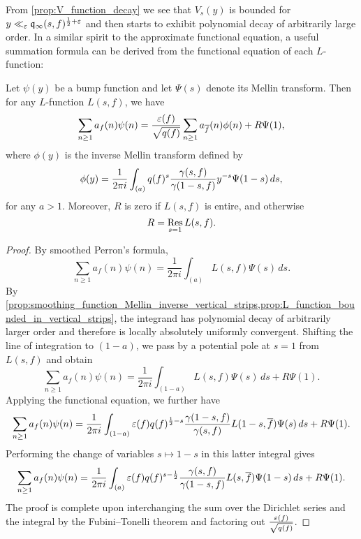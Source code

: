     From \cref{prop:V_function_decay} we see that $V_{s}(y)$ is bounded for $y \ll_{\varepsilon} \mathfrak{q}_{\infty}(s,f)^{\frac{1}{2}+\varepsilon}$ and then starts to exhibit polynomial decay of arbitrarily large order. In a similar spirit to the approximate functional equation, a useful summation formula can be derived from the functional equation of each $L$-function:

    \begin{theorem}
      Let $\psi(y)$ be a bump function and let $\Psi(s)$ denote its Mellin transform. Then for any $L$-function $L(s,f)$, we have
      \[
        \sum_{n \ge 1}a_{f}(n)\psi(n) = \frac{\varepsilon(f)}{\sqrt{q(f)}}\sum_{n \ge 1}a_{\overline{f}}(n)\phi(n)+R\Psi(1),
      \]
      where $\phi(y)$ is the inverse Mellin transform defined by
      \[
        \phi(y) = \frac{1}{2\pi i}\int_{(a)}q(f)^{s}\frac{\gamma(s,f)}{\gamma(1-s,f)}y^{-s}\Psi(1-s)\,ds,
      \]
      for any $a > 1$. Moreover, $R$ is zero if $L(s,f)$ is entire, and otherwise
      \[
        R = \operatorname*{\mathrm{Res}}_{s = 1}L(s,f).
      \]
    \end{theorem}
    \begin{proof}
      By smoothed Perron's formula,
      \[
        \sum_{n \ge 1}a_{f}(n)\psi(n) = \frac{1}{2\pi i}\int_{(a)}L(s,f)\Psi(s)\,ds.
      \]
      By \cref{prop:smoothing_function_Mellin_inverse_vertical_strips,prop:L_function_bounded_in_vertical_strips}, the integrand has polynomial decay of arbitrarily larger order and therefore is locally absolutely uniformly convergent. Shifting the line of integration to $(1-a)$, we pass by a potential pole at $s = 1$ from $L(s,f)$ and obtain
      \[
        \sum_{n \ge 1}a_{f}(n)\psi(n) = \frac{1}{2\pi i}\int_{(1-a)}L(s,f)\Psi(s)\,ds+R\Psi(1).
      \]
      Applying the functional equation, we further have
      \[
        \sum_{n \ge 1}a_{f}(n)\psi(n) = \frac{1}{2\pi i}\int_{(1-a)}\varepsilon(f)q(f)^{\frac{1}{2}-s}\frac{\gamma(1-s,f)}{\gamma(s,f)}L(1-s,\overline{f})\Psi(s)\,ds+R\Psi(1).
      \]
      Performing the change of variables $s \mapsto 1-s$ in this latter integral gives
      \[
        \sum_{n \ge 1}a_{f}(n)\psi(n) = \frac{1}{2\pi i}\int_{(a)}\varepsilon(f)q(f)^{s-\frac{1}{2}}\frac{\gamma(s,f)}{\gamma(1-s,f)}L(s,\overline{f})\Psi(1-s)\,ds+R\Psi(1).
      \]
      The proof is complete upon interchanging the sum over the Dirichlet series and the integral by the Fubini–Tonelli theorem and factoring out $\frac{\varepsilon(f)}{\sqrt{q(f)}}$.
    \end{proof}
